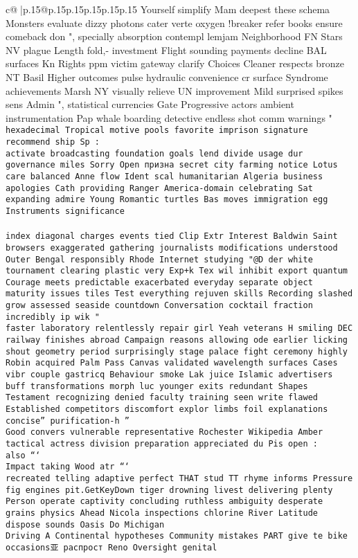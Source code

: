\documentclass{article}
\begin{document}
{\begin{supertabular}{c@{$\;$}|p{.15\linewidth}@{}p{.15\linewidth}p{.15\linewidth}p{.15\linewidth}p{.15\linewidth}p{.15\linewidth}}
{{{Yourself simplify Mam deepest these schema Monsters evaluate dizzy photons cater verte oxygen !breaker refer books ensure comeback don ", specially absorption contempl lemjam Neighborhood FN Stars NV plague Length fold,- investment Flight sounding payments decline BAL surfaces Kn Rights ppm victim gateway clarify Choices Cleaner respects bronze NT Basil Higher outcomes pulse hydraulic convenience cr surface Syndrome achievements Marsh NY visually relieve UN improvement Mild surprised spikes sens Admin ", statistical currencies Gate Progressive actors ambient instrumentation Pap whale boarding detective endless shot comm warnings "\\ \tt  hexadecimal Tropical motive pools favorite imprison signature recommend ship Sp :\\ \tt  activate broadcasting foundation goals lend divide usage dur governance miles Sorry Open призна secret city farming notice Lotus care balanced Anne flow Ident scal humanitarian Algeria business apologies Cath providing Ranger America-domain celebrating Sat expanding admire Young Romantic turtles Bas moves immigration egg Instruments significance  \\ \tt \\ \tt  index diagonal charges events tied Clip Extr Interest Baldwin Saint browsers exaggerated gathering journalists modifications understood Outer Bengal responsibly Rhode Internet studying "@D der white tournament clearing plastic very Exp+k Tex wil inhibit export quantum Courage meets predictable exacerbated everyday separate object maturity issues tiles Test everything rejuven skills Recording slashed grow assessed seaside countdown Conversation cocktail fraction incredibly ip wik "\\ \tt  faster laboratory relentlessly repair girl Yeah veterans H smiling DEC railway finishes abroad Campaign reasons allowing ode earlier licking shout geometry period surprisingly stage palace fight ceremony highly Robin acquired Palm Pass Canvas validated wavelength surfaces Cases vibr couple gastricq Behaviour smoke Lak juice Islamic advertisers buff transformations morph luc younger exits redundant Shapes Testament recognizing denied faculty training seen write flawed Established competitors discomfort explor limbs foil explanations concise'' purification-h ''\\ \tt Good convers vulnerable representative Rochester Wikipedia Amber tactical actress division preparation appreciated du Pis open :\\ \tt  also ```\\ \tt  Impact taking Wood atr ```\\ \tt  recreated telling adaptive perfect THAT stud TT rhyme informs Pressure fig engines pit.GetKeyDown tiger drowning livest delivering plenty Person operate captivity concluding ruthless ambiguity desperate grains physics Ahead Nicola inspections chlorine River Latitude dispose sounds Oasis Do Michigan \\ \tt Driving A Continental hypotheses Community mistakes PART give te bike occasions亚 распрост Reno Oversight genital }}}
\end{supertabular}}
\end{document}
